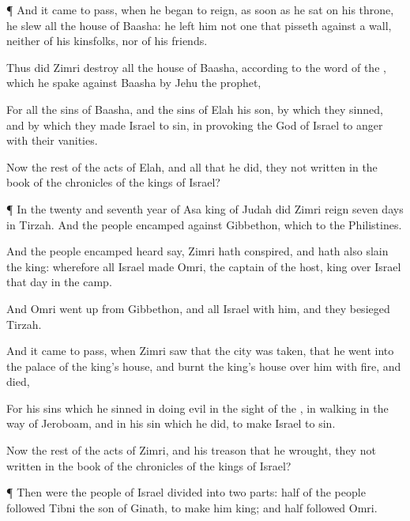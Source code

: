 {\par }{\PP {}¶ And it came to pass, when he began to
reign, as soon as he
sat on his
throne,
{} he
slew all the
house of
Baasha: he
left him not one that
pisseth against a
wall, neither of his
kinsfolks, nor of his
friends.

Thus did
Zimri
destroy all the
house of
Baasha, according to the
word of the
{}, which he
spake against
Baasha
by
Jehu the
prophet,

For all the
sins of
Baasha, and the
sins of
Elah his
son, by which they
sinned, and by which they made
Israel to
sin, in provoking the
{}
God of
Israel to
anger with their
vanities.

Now the
rest of the
acts of
Elah, and all that he
did,
{} they not
written in the
book of the
chronicles of the
kings of
Israel?


\par }{\PP {}¶ In the
twenty and
seventh
year of
Asa
king of
Judah did
Zimri
reign
seven
days in
Tirzah. And the
people
{}
encamped against
Gibbethon, which
{} to the
Philistines.

And the
people
{}
encamped
heard
say,
Zimri hath
conspired, and hath also
slain the
king: wherefore all
Israel made
Omri, the
captain of the
host,
king over
Israel that
day in the
camp.

And
Omri went
up from
Gibbethon, and all
Israel with him, and they
besieged
Tirzah.

And it came to pass, when
Zimri
saw that the
city was
taken, that he
went into the
palace of the
king’s
house, and
burnt the
king’s
house over him with
fire, and
died,

For his
sins which he
sinned in
doing
evil in the
sight of the
{}, in
walking in the
way of
Jeroboam, and in his
sin which he
did, to make
Israel to
sin.

Now the
rest of the
acts of
Zimri, and his
treason that he
wrought,
{} they not
written in the
book of the
chronicles of the
kings of
Israel?


\par }{\PP {}¶ Then were the
people of
Israel
divided into two
parts:
half of the
people
followed
Tibni the
son of
Ginath, to make him
king; and
half
followed
Omri.

}
